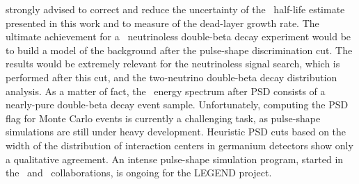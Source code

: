 strongly advised to correct and reduce the uncertainty of the \nnbb\ half-life estimate
presented in this work and to measure of the dead-layer growth rate.
\newpar
The ultimate achievement for a \gesix\ neutrinoless double-beta decay experiment would be
to build a model of the background after the pulse-shape discrimination cut. The results
would be extremely relevant for the neutrinoless signal search, which is performed after
this cut, and the two-neutrino double-beta decay distribution analysis. As a matter of
fact, the \gerda\ energy spectrum after PSD consists of a nearly-pure double-beta decay
event sample. Unfortunately, computing the PSD flag for Monte Carlo events is currently a
challenging task, as pulse-shape simulations are still under heavy development. Heuristic
PSD cuts based on the width of the distribution of interaction centers in germanium
detectors show only a qualitative agreement. An intense pulse-shape simulation program,
started in the \gerda\ and \majorana\ collaborations, is ongoing for the LEGEND project.

\chapendgliph{}

